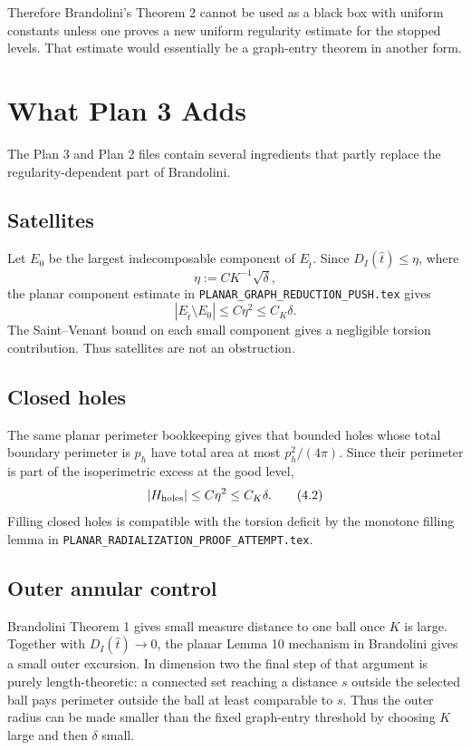 \documentclass[11pt]{article}
\newcommand{\Et}{E_{\hat t}}
\begin{document}
Therefore Brandolini's Theorem 2 cannot be used as a black box with uniform
constants unless one proves a new uniform regularity estimate for the stopped
levels.  That estimate would essentially be a graph-entry theorem in another
form.

\section{What Plan 3 Adds}

The Plan 3 and Plan 2 files contain several ingredients that partly replace
the regularity-dependent part of Brandolini.

\subsection{Satellites}

Let \(E_0\) be the largest indecomposable component of \(\Et\).  Since
\(D_I(\hat t)\le \eta\), where
\[
   \eta:=C K^{-1}\sqrt\delta,
\]
the planar component estimate in
\texttt{PLANAR\_GRAPH\_REDUCTION\_PUSH.tex} gives
\[
   |\Et\setminus E_0|\le C\eta^2\le C_K\delta.
   \tag{4.1}\label{eq:satellites}
\]
The Saint--Venant bound on each small component gives a negligible torsion
contribution.  Thus satellites are not an obstruction.

\subsection{Closed holes}

The same planar perimeter bookkeeping gives that bounded holes whose total
boundary perimeter is \(p_h\) have total area at most \(p_h^2/(4\pi)\).  Since
their perimeter is part of the isoperimetric excess at the good level,
\[
   |H_{\rm holes}|\le C\eta^2\le C_K\delta.
   \tag{4.2}\label{eq:holes}
\]
Filling closed holes is compatible with the torsion deficit by the monotone
filling lemma in \texttt{PLANAR\_RADIALIZATION\_PROOF\_ATTEMPT.tex}.

\subsection{Outer annular control}

Brandolini Theorem 1 gives small measure distance to one ball once \(K\) is
large.  Together with \(D_I(\hat t)\to0\), the planar Lemma 10 mechanism in
Brandolini gives a small outer excursion.  In dimension two the final step of
that argument is purely length-theoretic: a connected set reaching a distance
\(s\) outside the selected ball pays perimeter outside the ball at least
comparable to \(s\).  Thus the outer radius can be made smaller than the
fixed graph-entry threshold by choosing \(K\) large and then \(\delta\) small.
\end{document}
